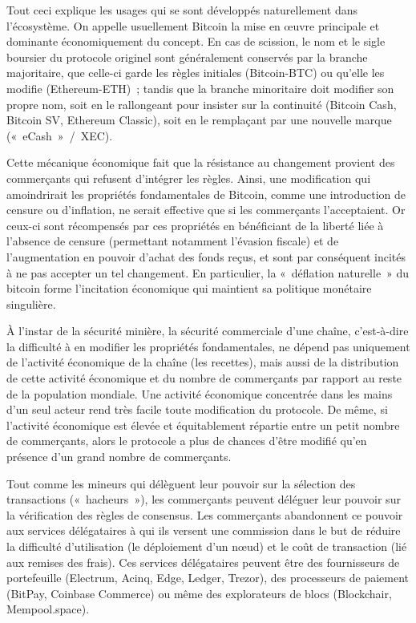 Tout ceci explique les usages qui se sont développés naturellement dans l'écosystème. On appelle usuellement Bitcoin la mise en œuvre principale et dominante économiquement du concept. En cas de scission, le nom et le sigle boursier du protocole originel sont généralement conservés par la branche majoritaire, que celle-ci garde les règles initiales (Bitcoin-BTC) ou qu'elle les modifie (Ethereum-ETH)~; tandis que la branche minoritaire doit modifier son propre nom, soit en le rallongeant pour insister sur la continuité (Bitcoin Cash, Bitcoin SV, Ethereum Classic), soit en le remplaçant par une nouvelle marque («~eCash~»~/~XEC).

Cette mécanique économique fait que la résistance au changement provient des commerçants qui refusent d'intégrer les règles. Ainsi, une modification qui amoindrirait les propriétés fondamentales de Bitcoin, comme une introduction de censure ou d'inflation, ne serait effective que si les commerçants l'acceptaient. Or ceux-ci sont récompensés par ces propriétés en bénéficiant de la liberté liée à l'absence de censure (permettant notamment l'évasion fiscale) et de l'augmentation en pouvoir d'achat des fonds reçus, et sont par conséquent incités à ne pas accepter un tel changement. En particulier, la «~déflation naturelle~» du bitcoin forme l'incitation économique qui maintient sa politique monétaire singulière.

À l'instar de la sécurité minière, la sécurité commerciale d'une chaîne, c'est-à-dire la difficulté à en modifier les propriétés fondamentales, ne dépend pas uniquement de l'activité économique de la chaîne (les recettes), mais aussi de la distribution de cette activité économique et du nombre de commerçants par rapport au reste de la population mondiale. Une activité économique concentrée dans les mains d'un seul acteur rend très facile toute modification du protocole. De même, si l'activité économique est élevée et équitablement répartie entre un petit nombre de commerçants, alors le protocole a plus de chances d'être modifié qu'en présence d'un grand nombre de commerçants.

Tout comme les mineurs qui délèguent leur pouvoir sur la sélection des transactions («~hacheurs~»), les commerçants peuvent déléguer leur pouvoir sur la vérification des règles de consensus. Les commerçants abandonnent ce pouvoir aux services délégataires à qui ils versent une commission dans le but de réduire la difficulté d'utilisation (le déploiement d'un nœud) et le coût de transaction (lié aux remises des frais). Ces services délégataires peuvent être des fournisseurs de portefeuille (Electrum, Acinq, Edge, Ledger, Trezor), des processeurs de paiement (BitPay, Coinbase Commerce) ou même des explorateurs de blocs (Blockchair, Mempool.space).

